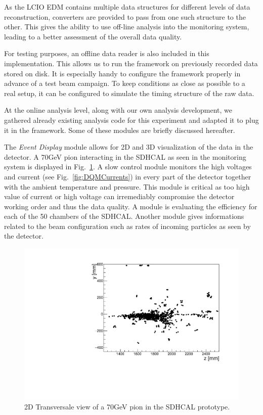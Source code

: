 \documentclass[conference]{IEEEtran}
\begin{document}
As the LCIO EDM contains multiple data structures for different levels of data reconstruction, converters are provided to pass from one such structure to the other. This gives the ability to use off-line analysis into the monitoring system, leading to a better assessment of the overall data quality.

For testing purposes, an offline data reader is also included in this implementation. This allows us to run the framework on previously recorded data stored on disk. It is especially handy to configure the framework properly in advance of a test beam campaign. To keep conditions as close as possible to a real setup, it can be configured to simulate the timing structure of the raw data.

At the online analysis level, along with our own analysis development, we gathered already existing analysis code for this experiment and adapted it to plug it in the framework. Some of these modules are briefly discussed hereafter.

The \textit{Event Display} module allows for 2D and 3D visualization of the data in the detector. A 70GeV pion interacting in the SDHCAL as seen in the monitoring system is displayed in Fig.~\ref{fig:DQMEventDisplay}. A slow control module monitors the high voltages and current (see Fig.~\ref{fig:DQMCurrents}) in every part of the detector together with the ambient temperature and pressure. This module is critical as too high value of current or high voltage can irremediably compromise the detector working order and thus the data quality. A module is evaluating the efficiency for each of the 50 chambers of the SDHCAL. Another module gives informations related to the beam configuration such as rates of incoming particles as seen by the detector.

\begin{figure}[htbp]
  \begin{center}
    \includegraphics[width=0.95\linewidth]{figs/DQM_SDHCAL_Shower_pi-_70GeV_I732792.pdf}
    \caption{\label{fig:DQMEventDisplay} 2D Transversale view of a 70GeV pion in the SDHCAL prototype.}
  \end{center}
\end{figure}
\end{document}
